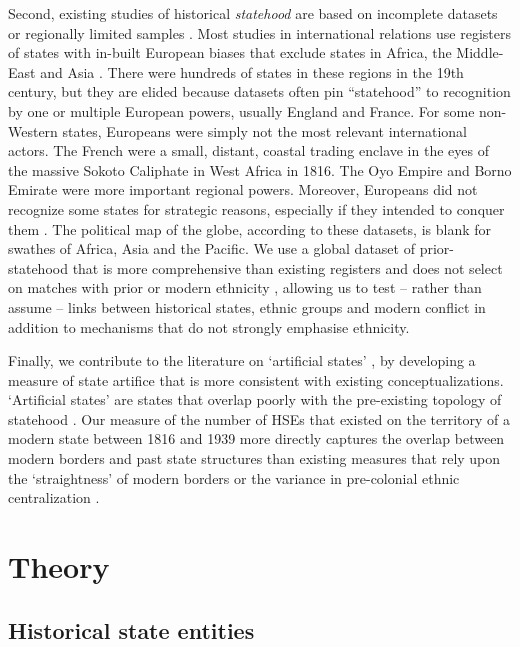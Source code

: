 Second, existing studies of historical \textit{statehood} are based on
incomplete datasets or regionally limited samples \citep{Besley2014,
Depetris-Chauvin2016, Dincecco2019, Michalopoulos2016, Nunn2008}. Most studies
in international relations use registers of states with in-built European biases
that exclude states in Africa, the Middle-East and Asia \citep{Sarkees2010,
Gleditsch1999}. There were hundreds of states in these regions in the 19th
century, but they are elided because datasets often pin “statehood” to
recognition by one or multiple European powers, usually England and France. For
some non-Western states, Europeans were simply not the most relevant
international actors. The French were a small, distant, coastal trading enclave
in the eyes of the massive Sokoto Caliphate in West Africa in 1816. The Oyo
Empire and Borno Emirate were more important regional powers. Moreover,
Europeans did not recognize some states for strategic reasons, especially if
they intended to conquer them \citep{Teorell2017}. The political map of the
globe, according to these datasets, is blank for swathes of Africa, Asia and the
Pacific. We use a global dataset of prior-statehood that is more comprehensive
than existing registers and does not select on matches with prior or modern
ethnicity \citep{Butcher2020}, allowing us to test -- rather than assume --
links between historical states, ethnic groups and modern conflict in addition
to mechanisms that do not strongly emphasise ethnicity. 

Finally, we contribute to the literature on `artificial states'
\citep{Alesina2011, Englebert2000, Herbst2014, Clapham1996}, by developing a
measure of state artifice that is more consistent with existing
conceptualizations. `Artificial states' are states that overlap poorly with the
pre-existing topology of statehood \citep{Alesina2011, Herbst2014}. Our measure
of the number of HSEs that existed on the territory
of a modern state between 1816 and 1939 more directly captures the overlap
between modern borders and past state structures than existing measures that
rely upon the `straightness' of modern borders \citep{Alesina2011} or the
variance in pre-colonial ethnic centralization \citep{Englebert2002}. 

    
\section{Theory}

\subsection{Historical state entities}

